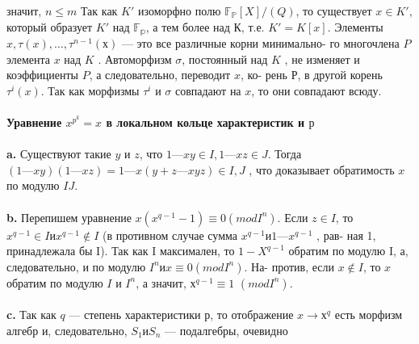 \pagebreak
\noindent значит, $n \leq m$ Так как $K'$ изоморфно полю $\mathbb{F_P}[X]/(Q)$, то существует\linebreak
$x \in K'$, который образует $K'$ над $\mathbb{F_p}$, а тем более над К, т.е. $K' = K[x].$\linebreak
Элементы $x, \tau(x),\ldots,\tau^{n-1}(х)$ --- это все различные корни минимально-\linebreak
го многочлена $P$ элемента $x$ над $K$ . Автоморфизм $\sigma$, постоянный над
$K$ , не изменяет и коэффициенты $P$, а следовательно, переводит $x$, ко-\linebreak
рень $Р$, в другой корень $\tau^{i}(x)$. Так как морфизмы $\tau^{i}$ и $\sigma$ совпадают на\linebreak
$x$, то они совпадают всюду.\\
\\
\noindent\textbf{Уравнение $x^{p^{k}} = x$ в локальном кольце характеристик и $р$}\\
\\
\hspace*{15pt}\textbf{a.} Существуют такие $y$ и $z$, что $1 — xy \in I, 1 — xz \in J.$ Тогда\linebreak
$(1 — xy)(1 — xz) = 1 — x(y + z — xyz) \in I,J$ , что доказывает обратимость
$x$ по модулю $I J$.\\
\\
\hspace*{15pt}\textbf{b.} Перепишем уравнение $x(x^{q-1} - 1) \equiv 0 (mod I^{n})$. Если $z \in I$, то\linebreak
$x^{q-1} \in I и x^{q-1} \notin I$ (в противном случае сумма $x^{q-1} и 1 — x^{q-1}$ , рав-\linebreak
ная 1, принадлежала бы I). Так как I максимален, то $1 - X^{q-1}$ обратим
по модулю I, а, следовательно, и по модулю $I^{n} и x \equiv 0 (mod I^{n})$. На-\linebreak
против, если $x \notin I$, то $x$ обратим по модулю $I$ и $I^{n}$, а значит, $х^{q-1} \equiv 1$\linebreak
$(mod I^{n})$.\\
\\
\hspace*{15pt}\textbf{c.} Так как $q$ --- степень характеристики $р$, то отображение $x \rightarrow х^{q}$
есть морфизм алгебр и, следовательно, $S_1 и S_n$ --- подалгебры, очевидно
